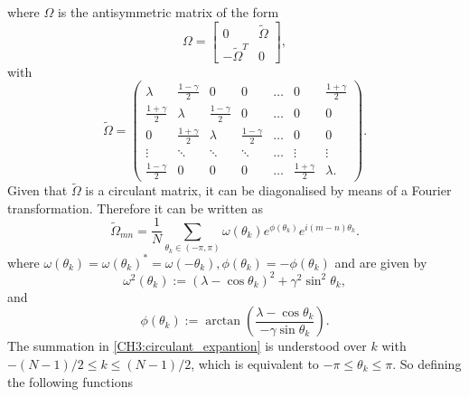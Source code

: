 where $\Omega$ is the antisymmetric matrix of the form
\begin{equation}
\Omega=\left[\begin{array}{c|c}
0 & \tilde{\Omega} \\
\hline -\tilde{\Omega}^{T} & 0
\end{array}\right],
\label{CH3:Block_matrix}
\end{equation}
with 
\begin{equation}
\tilde{\Omega}=\begin{pmatrix}
\lambda & \frac{1-\gamma}{2} & 0 &0 &\ldots  &0 &\frac{1+\gamma}{2}\\
\frac{1+\gamma}{2} & \lambda & \frac{1-\gamma}{2} & 0 &\ldots &0 &0\\
0 & \frac{1+\gamma}{2} & \lambda & \frac{1-\gamma}{2} &\ldots &0 &0\\
\vdots& \ddots & \ddots & \ddots & \ldots &  \vdots & \vdots\\
\frac{1-\gamma}{2}&0&0&0&\ldots & \frac{1+\gamma}{2} & \lambda.
\end{pmatrix}.
\label{CH3:Hamiltonian_matrix_XY_model}
\end{equation}
Given that $\tilde{\Omega}$ is a circulant matrix,  it can be diagonalised by means of a Fourier transformation. Therefore it can be written as
\begin{equation}
\tilde{\Omega}_{m n}=\frac{1}{N} \sum_{\theta_{k} \in(-\pi, \pi)} \omega\left(\theta_{k}\right) e^{\phi\left(\theta_{k}\right)} e^{i(m-n) \theta_{k}}.
\label{CH3:circulant_expantion}
\end{equation}
where $\omega\left(\theta_{k}\right)=\omega\left(\theta_{k}\right)^{*}=\omega\left(-\theta_{k}\right), \phi\left(\theta_{k}\right)=-\phi\left(\theta_{k}\right)$ and are given by
\begin{equation}
\omega^{2}\left(\theta_{k}\right):=\left(\lambda-\cos \theta_{k}\right)^{2}+\gamma^{2} \sin ^{2} \theta_{k},
\end{equation}
and
\begin{equation}
\phi\left(\theta_{k}\right):=\arctan \left(\frac{\lambda-\cos \theta_{k}}{-\gamma \sin \theta_{k}}\right).
\end{equation}
The summation in \eqref{CH3:circulant_expantion} is understood over $k$ with $-(N-1)/2\leq k \leq (N-1)/2$, which is equivalent to $-\pi\leq \theta_k \leq \pi$. So defining the following functions

